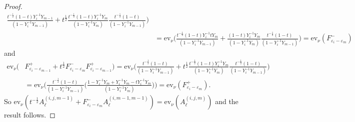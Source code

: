 \documentclass[11pt]{article}
\theoremstyle{plain}
\theoremstyle{definition}
\theoremstyle{remark}
\numberwithin{equation}{section}
\def\ev{\mathrm{ev}}
\newcounter{r}
\newcounter{s}
\begin{document}
\begin{proof}
\begin{align*}
\frac{t^{-\frac12}(1-t)Y_i^{-1}Y_{m-1}}{(1-Y_i^{-1}Y_{m-1})}+
t^{\frac12}
\frac{t^{-\frac12}(1-t)Y_i^{-1}Y_m}{(1-Y_i^{-1}Y_m)}
\frac{t^{-\frac12}(1-t)}{(1-Y_i^{-1}Y_{m-1})}
\Big)
\\
&= \ev_\nu\Big(
\frac{t^{-\frac12}(1-t)Y_i^{-1}tY_m}{(1-Y_i^{-1}Y_{m-1})}+
\frac{(1-t)Y_i^{-1}Y_m}{(1-Y_i^{-1}Y_m)}
\frac{t^{-\frac12}(1-t)}{(1-Y_i^{-1}Y_{m-1})}
\Big)
=\ev_\nu(F^-_{\varepsilon_i-\varepsilon_m})
\end{align*}
and
\begin{align*}
\ev_\nu(&F^+_{\varepsilon_i - \varepsilon_{m-1}}
+t^{\frac12}F^-_{\varepsilon_i-\varepsilon_m}F^+_{\varepsilon_i - \varepsilon_{m-1}}) 
= \ev_\nu\Big(
\frac{t^{-\frac12}(1-t)}{(1-Y_i^{-1}Y_{m-1})}+
t^{\frac12}
\frac{t^{-\frac12}(1-t)Y_i^{-1}Y_m}{(1-Y_i^{-1}Y_m)}
\frac{t^{-\frac12}(1-t)}{(1-Y_i^{-1}Y_{m-1})}
\Big)
\\
&= \ev_\nu\Big(
\frac{t^{-\frac12}(1-t)}{(1-Y_i^{-1}Y_{m-1})}\Big(
\frac{1-Y_i^{-1}Y_m+Y_i^{-1}Y_m -tY_i^{-1}Y_m}{(1-Y_i^{-1}Y_m)}
\Big)\Big)
=  \ev_\nu(F^+_{\varepsilon_i-\varepsilon_m}).
\end{align*}
So
$\ev_\nu(t^{-\frac12}A_\ell^{(i,j,m-1)} +F^-_{\varepsilon_i-\varepsilon_m} A_\ell^{(i,m-1,m-1)})
= \ev_\nu(A_\ell^{(i,j,m)})$ and the result follows.
\end{proof}
\end{document}
